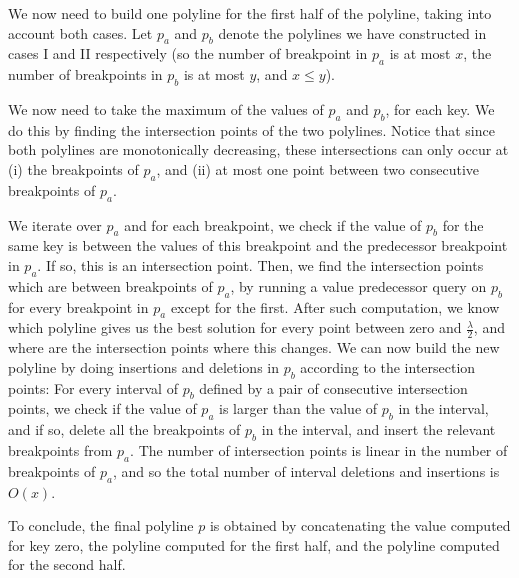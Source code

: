 \documentclass[a4paper,UKenglish]{lipics-v2016}
\theoremstyle{plain}
\begin{document}
\vspace{0.04in} 
We now need to build one polyline for the first half of the polyline, taking into account both cases. Let $p_a$ and $p_b$ denote the polylines we have constructed in cases I and II respectively (so the number of breakpoint in $p_a$ is at most $x$, the number of breakpoints in $p_b$ is at most $y$, and $x\leq y$).

We now need to take the maximum of the values of $p_a$ and $p_b$, for each key. We do this by finding the intersection points of the two polylines. Notice that since both polylines are monotonically decreasing, these intersections can only occur at (i) the breakpoints of $p_a$, and (ii) at most one point between two consecutive breakpoints of $p_a$.

We iterate over $p_a$ and for each breakpoint, we check if the value of $p_b$ for the same key is between the values of this breakpoint and the predecessor breakpoint in $p_a$. If so, this is an intersection point. Then, we find the intersection points which are between breakpoints of $p_a$, by running a value predecessor query on $p_b$ for every breakpoint in $p_a$ except for the first. %
After such computation, we know which polyline gives us the best solution for every point between zero and $\frac{\lambda}{2}$, and where are the intersection points where this changes. We can now build the new polyline by doing insertions and deletions in $p_b$ according to the intersection points: For every interval of $p_b$ defined by a pair of consecutive intersection points, we check if the value of $p_a$ is larger than the value of $p_b$ in the interval, and if so, delete all the breakpoints of $p_b$ in the interval, and insert the relevant breakpoints from $p_a$. The number of intersection points is linear in the number of breakpoints of $p_a$, and so the total number of interval deletions and insertions is $O(x)$.

To conclude, the final polyline $p$ is obtained by concatenating the value computed for key zero, the polyline computed for the first half, and the polyline computed for the second half. 
\end{document}
